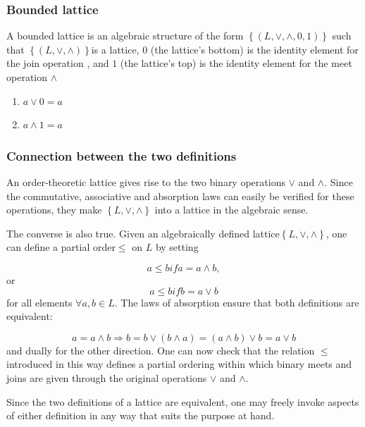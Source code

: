 \documentclass{conm-p-l}
\theoremstyle{definition}
\theoremstyle{remark}
\numberwithin{equation}{section}
\theoremstyle{plain}
\begin{document}
\subsubsection{Bounded lattice}

A bounded lattice is an algebraic structure of the form $\left\{ (L,\vee
,\wedge ,0,1)\right\} $ such that $\left\{ (L,\vee ,\wedge )\right\} $is a
lattice, $0$ (the lattice's bottom) is the identity element for the join
operation  , and $1$ (the lattice's top) is the identity element for the
meet operation $\wedge $

\begin{enumerate}
\item $a\vee 0=a$

\item $a\wedge 1=a$
\end{enumerate}

\subsubsection{Connection between the two definitions}

An order-theoretic lattice gives rise to the two binary operations $\vee $
and $\wedge $. Since the commutative, associative and absorption laws can
easily be verified for these operations, they make $\left\{ L,\vee ,\wedge
\right\} $ into a lattice in the algebraic sense.

The converse is also true. Given an algebraically defined lattice$\left\{
L,\vee ,\wedge \right\} $, one can define a partial order$\leq $ on $L$ by
setting

\begin{equation}
a\leq bifa=a\wedge b,
\end{equation}
or%
\begin{equation}
a\leq bifb=a\vee b
\end{equation}%
for all elements $\forall a,b\in L$. The laws of absorption ensure that both
definitions are equivalent:

\begin{equation}
a=a\wedge b\Rightarrow b=b\vee (b\wedge a)=(a\wedge b)\vee b=a\vee b
\end{equation}%
and dually for the other direction. One can now check that the relation $%
\leq $ introduced in this way defines a partial ordering within which binary
meets and joins are given through the original operations $\vee $ and $%
\wedge $.

Since the two definitions of a lattice are equivalent, one may freely invoke
aspects of either definition in any way that suits the purpose at hand. 
\end{document}
